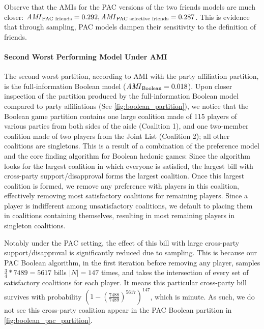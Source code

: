 Observe that the AMIs for the PAC versions of the two friends models are much
closer: $\mathit{AMI}_{\text{PAC friends}} = 0.292,
\mathit{AMI}_{\text{PAC selective friends}} = 0.287$.
This is evidence that through sampling, PAC models dampen their sensitivity to
the definition of friends.

\paragraph{Second Worst Performing Model Under AMI} 
The second worst partition, according to AMI with the party affiliation
partition, is the full-information Boolean model ($\mathit{AMI}_{\text{Boolean}} = 0.018$).
Upon closer inspection of the partition produced by the full-information Boolean
model compared to party affiliations (See \autoref{fig:boolean_partition}),
we notice that the Boolean game partition contains one large coalition made of 115
players of various parties from both sides of the aisle (Coalition 1),
and one two-member coalition made of two players from the Joint List (Coalition 2);
all other coalitions are singletons.
This is a result of a combination of the preference model and the core finding
algorithm for Boolean hedonic games:
Since the algorithm looks for the largest coalition in which everyone is
satisfied, the largest bill with cross-party support/disapproval forms the
largest coalition.
Once this largest coalition is formed, we remove any preference with players
in this coalition, effectively removing most satisfactory coalitions for
remaining players.
Since a player is indifferent among unsatisfactory coalitions, we default to
placing them in coalitions containing themselves, resulting in most remaining
players in singleton coalitions.

Notably under the PAC setting, the effect of this bill with large cross-party
support/disapproval is significantly reduced due to sampling.
This is because our PAC Boolean algorithm, in the first iteration before removing
any player, samples $\frac{3}{4} * 7489 = 5617$ bills $|N|=147$ times, and
takes the intersection of every set of satisfactory coalitions for each player.
It means this particular cross-party bill survives with probability
$(1 - (\frac{7488}{7489})^{5617})^{147}$, which is minute.
As such, we do not see this cross-party coalition appear in the PAC Boolean
partition in \autoref{fig:boolean_pac_partition}.

